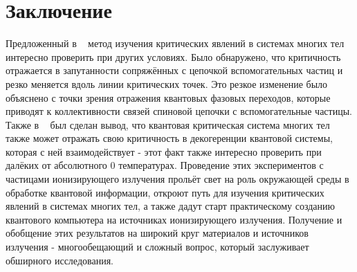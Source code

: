 \documentclass[11pt]{article}
\begin{document}
\section{Заключение}
Предложенный в ~\cite{b1} метод изучения критических явлений в системах многих тел интересно проверить при других условиях. Было обнаружено, что критичность отражается в запутанности сопряжённых с цепочкой вспомогательных частиц и резко меняется вдоль линии критических точек. Это резкое изменение было объяснено с точки зрения отражения квантовых фазовых переходов, которые приводят к коллективности связей спиновой цепочки с вспомогательные частицы. Также в ~\cite{b30} был сделан вывод, что квантовая критическая система многих тел также может отражать свою критичность в декогеренции квантовой системы, которая с ней взаимодействует - этот факт также интересно проверить при далёких от абсолютного 0 температурах. Проведение этих экспериментов с частицами ионизирующего излучения прольёт свет на роль окружающей среды в обработке квантовой информации, откроют путь для изучения критических явлений в системах многих тел, а также дадут старт практическому созданию квантового компьютера на источниках ионизирующего излучения. Получение и обобщение этих результатов на широкий круг материалов и источников излучения - многообещающий и сложный вопрос, который заслуживает обширного исследования.
\end{document}
